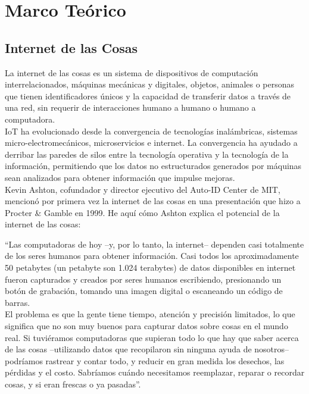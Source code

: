 \chapter{Marco Teórico}

\section{Internet de las Cosas}

La internet de las cosas es un sistema de dispositivos de computación interrelacionados, máquinas mecánicas y digitales, objetos, animales o personas que tienen identificadores únicos y la capacidad de transferir datos a través de una red, sin requerir de interacciones humano a humano o humano a computadora. \\

IoT ha evolucionado desde la convergencia de tecnologías inalámbricas, sistemas micro-electromecánicos, microservicios e internet. La convergencia ha ayudado a derribar las paredes de silos entre la tecnología operativa  y la tecnología de la información, permitiendo que los datos no estructurados generados por máquinas sean analizados para obtener información que impulse mejoras. \cite{TechT2017}\\

Kevin Ashton, cofundador y director ejecutivo del Auto-ID Center de MIT, mencionó por primera vez la internet de las cosas en una presentación que hizo a Procter \& Gamble en 1999. He aquí cómo Ashton explica el potencial de la internet de las cosas:

``Las computadoras de hoy –y, por lo tanto, la internet– dependen casi totalmente de los seres humanos para obtener información. Casi todos los aproximadamente 50 petabytes (un petabyte son 1.024 terabytes) de datos disponibles en internet fueron capturados y creados por seres humanos escribiendo, presionando un botón de grabación, tomando una imagen digital o escaneando un código de barras. \\

El problema es que la gente tiene tiempo, atención y precisión limitados, lo que significa que no son muy buenos para capturar datos sobre cosas en el mundo real. Si tuviéramos computadoras que supieran todo lo que hay que saber acerca de las cosas –utilizando datos que recopilaron sin ninguna ayuda de nosotros– podríamos rastrear y contar todo, y reducir en gran medida los desechos, las pérdidas y el costo. Sabríamos cuándo necesitamos reemplazar, reparar o recordar cosas, y si eran frescas o ya pasadas”. \cite{Asthon2009}\\


